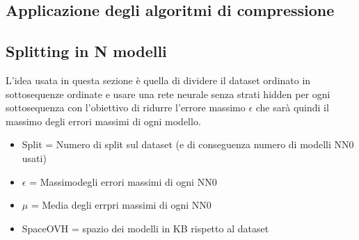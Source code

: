 \documentclass[11pt,a4paper,twoside,
openright]{book}
\begin{document}
\subsection{Applicazione degli algoritmi di compressione}
\subsection{Splitting in N modelli}
L'idea usata in questa sezione è quella di dividere il dataset ordinato in sottosequenze ordinate e usare una rete neurale senza strati hidden per ogni sottosequenza con l'obiettivo di ridurre l'errore massimo $\epsilon$ che sarà quindi il massimo degli errori massimi di ogni modello.

\begin{itemize}
		\item Split = Numero di split sul dataset (e di conseguenza numero di modelli NN0 usati)
		\item $\epsilon$ = Massimodegli errori massimi di ogni NN0
		\item $\mu$ = Media degli errpri massimi di ogni NN0
		\item SpaceOVH =  spazio dei modelli in KB rispetto al dataset
	\end{itemize}
	
\end{document}
